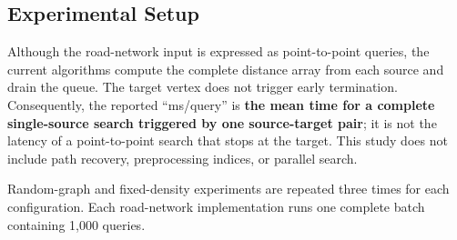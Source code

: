 \subsection{Experimental Setup}
Although the road-network input is expressed as point-to-point queries, the current
algorithms compute the complete distance array from each source and drain the queue.
The target vertex does not trigger early termination. Consequently, the reported
``ms/query'' is \textbf{the mean time for a complete single-source search triggered
by one source-target pair}; it is not the latency of a point-to-point search that
stops at the target. This study does not include path recovery, preprocessing
indices, or parallel search.

Random-graph and fixed-density experiments are repeated three times for each
configuration. Each road-network implementation runs one complete batch containing
1,000 queries.
